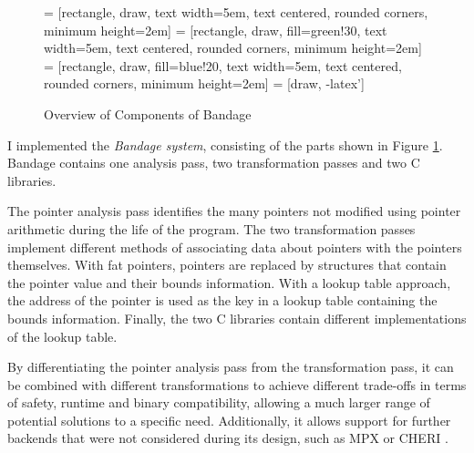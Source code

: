 \documentclass[a4paper,12pt,twoside,openright]{report}
\begin{document}
\begin{figure}
\centering
{} = [rectangle, draw, 
text width=5em, text centered, rounded corners, minimum height=2em]
 = [rectangle, draw, fill=green!30, 
text width=5em, text centered, rounded corners, minimum height=2em]
 = [rectangle, draw, fill=blue!20, 
text width=5em, text centered, rounded corners, minimum height=2em]
 = [draw, -latex']
\caption{Overview of Components of Bandage}
\label{fig:Components}
\end{figure}

I implemented the \textit{Bandage system}, consisting of the parts shown in Figure \ref{fig:Components}.
Bandage contains one analysis pass, two transformation passes and two C libraries.

The pointer analysis pass identifies the many pointers not modified using pointer arithmetic during the life of the program.
The two transformation passes implement different methods of associating data about pointers with the pointers themselves.
With fat pointers, pointers are replaced by structures that contain the pointer value and their bounds information.
With a lookup table approach, the address of the pointer is used as the key in a lookup table containing the bounds information.
Finally, the two C libraries contain different implementations of the lookup table.

By differentiating the pointer analysis pass from the transformation pass, it can be combined with different transformations to achieve different trade-offs in terms of safety, runtime and binary compatibility, allowing a much larger range of potential solutions to a specific need.
Additionally, it allows support for further backends that were not considered during its design, such as MPX \cite{mpx} or CHERI \cite{cheri}.
\end{document}
